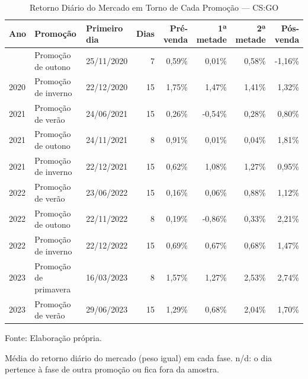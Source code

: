 \begin{table}[H]
\caption{Retorno Diário do Mercado em Torno de Cada Promoção — CS:GO}\label{tab:sale_events} 

\fontsize{12.0pt}{14.4pt}\selectfont

\begin{tabular*}{\linewidth}{@{\extracolsep{\fill}}lllrrrrr}
\toprule
\textbf{Ano} & \textbf{Promoção} & \textbf{Primeiro dia} & \textbf{Dias} & \textbf{Pré-venda} & \textbf{1ª metade} & \textbf{2ª metade} & \textbf{Pós-venda} \\
\midrule\addlinespace[2.5pt]
2020 & Promoção de outono & 25/11/2020 & 7 & 0,59\% & 0,01\% & 0,58\% & -1,16\% \\
2020 & Promoção de inverno & 22/12/2020 & 15 & 1,75\% & 1,47\% & 1,41\% & 1,32\% \\
2021 & Promoção de verão & 24/06/2021 & 15 & 0,26\% & -0,54\% & 0,28\% & 0,80\% \\
2021 & Promoção de outono & 24/11/2021 & 8 & 0,91\% & 0,01\% & 0,04\% & 1,81\% \\
2021 & Promoção de inverno & 22/12/2021 & 15 & 0,62\% & 1,08\% & 1,27\% & 0,95\% \\
2022 & Promoção de verão & 23/06/2022 & 15 & 0,16\% & 0,06\% & 0,88\% & 1,12\% \\
2022 & Promoção de outono & 22/11/2022 & 8 & 0,19\% & -0,86\% & 0,33\% & 2,21\% \\
2022 & Promoção de inverno & 22/12/2022 & 15 & 0,69\% & 0,67\% & 0,68\% & 1,47\% \\
2023 & Promoção de primavera & 16/03/2023 & 8 & 1,57\% & 1,27\% & 2,53\% & 2,74\% \\
2023 & Promoção de verão & 29/06/2023 & 15 & 1,29\% & 0,68\% & 2,04\% & 1,70\% \\
\bottomrule
\end{tabular*}
\par\vspace{\belowcaptionskip}\footnotesize Fonte: Elaboração própria.\par
\begin{minipage}{\linewidth}
Média do retorno diário do mercado (peso igual) em cada fase. n/d: o dia pertence à fase de outra promoção ou fica fora da amostra.\\
\end{minipage}
\end{table}
